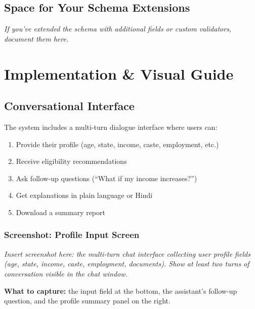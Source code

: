 \documentclass[11pt,a4paper]{report}
\newcommand{\taglabel}[2]{%
  {\footnotesize\bfseries\color{#1}[\,\textsc{#2}\,]}%
}
\newcommand{\tui}{\taglabel{tagUI}{ui}}
\newenvironment{notebox}{%
  \begin{callout}%
}{%
  \end{callout}%
}
\begin{document}
\section{Space for Your Schema Extensions}

\begin{notebox}
\Large\vspace{3cm}

\noindent\textcolor{dark}{\emph{If you've extended the schema with additional fields or custom validators, document them here.}}

\vspace{3cm}
\end{notebox}

\chapter{Implementation \& Visual Guide}

\section{Conversational Interface}

The system includes a multi-turn dialogue interface where users can:

\begin{enumerate}
  \item Provide their profile (age, state, income, caste, employment, etc.)
  \item Receive eligibility recommendations
  \item Ask follow-up questions (``What if my income increases?'')
  \item Get explanations in plain language or Hindi
  \item Download a summary report
\end{enumerate}


\subsection{Screenshot: Profile Input Screen}

\begin{callout}[title={\tui~Conversational Profile Input}]
\textit{Insert screenshot here: the multi-turn chat interface collecting user profile
fields (age, state, income, caste, employment, documents). Show at least two turns
of conversation visible in the chat window.}

\vspace{0.4cm}
\textbf{What to capture:} the input field at the bottom, the assistant's
follow-up question, and the profile summary panel on the right.
\end{callout}
\end{document}
